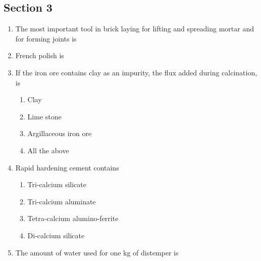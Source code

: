 \documentclass[11pt,a4paper]{article}
\begin{document}
\subsection*{Section 3}
\begin{enumerate}
\item{The most important tool in brick laying for lifting and spreading mortar and for forming joints is}
\\
\item{French polish is}
\\
\item{If the iron ore contains clay as an impurity, the flux added during calcination, is}
\begin{enumerate}[label=\Alph*.]
\item{Clay}
\item{Lime stone}
\item{Argillaceous iron ore}
\item{All the above}
\end{enumerate}
\item{Rapid hardening cement contains}
\begin{enumerate}[label=\Alph*.]
\item{Tri-calcium silicate}
\item{Tri-calcium aluminate}
\item{Tetra-calcium alumino-ferrite}
\item{Di-calcium silicate}
\end{enumerate}
\item{The amount of water used for one kg of distemper is}
\\
\end{enumerate}
\end{document}
